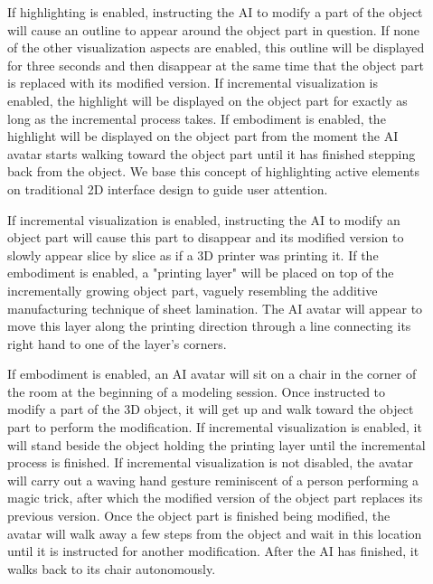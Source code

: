 \begin{description}

\item[\ivHigh] 
If highlighting is enabled, instructing the AI to modify a part of the object will cause an outline to appear around the object part in question. If none of the other visualization aspects are enabled, this outline will be displayed for three seconds and then disappear at the same time that the object part is replaced with its modified version. If incremental visualization is enabled, the highlight will be displayed on the object part for exactly as long as the incremental process takes. If embodiment is enabled, the highlight will be displayed on the object part from the moment the AI avatar starts walking toward the object part until it has finished stepping back from the object. We base this concept of highlighting active elements on traditional 2D interface design to guide user attention.%


\item[\ivInc]
If incremental visualization is enabled, instructing the AI to modify an object part will cause this part to disappear and its modified version to slowly appear slice by slice as if a 3D printer was printing it. If the embodiment is enabled, a "printing layer" will be placed on top of the incrementally growing object part, vaguely resembling the additive manufacturing technique of sheet lamination. The AI avatar will appear to move this layer along the printing direction through a line connecting its right hand to one of the layer's corners.
	
\item[\ivEmb] 
If embodiment is enabled, an AI avatar will sit on a chair in the corner of the room at the beginning of a modeling session. Once instructed to modify a part of the 3D object, it will get up and walk toward the object part to perform the modification. If incremental visualization is enabled, it will stand beside the object holding the printing layer until the incremental process is finished. If incremental visualization is not disabled, the avatar will carry out a waving hand gesture reminiscent of a person performing a magic trick, after which the modified version of the object part replaces its previous version. Once the object part is finished being modified, the avatar will walk away a few steps from the object and wait in this location until it is instructed for another modification. After the AI has finished, it walks back to its chair autonomously.

\end{description}

